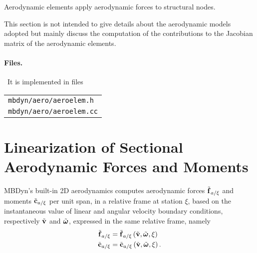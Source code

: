 %
%
%
%
%
% 
%
%
%

Aerodynamic elements apply aerodynamic forces to structural nodes.

This section is not intended 
to give details about the aerodynamic models adopted but mainly 
discuss the computation of the contributions to the Jacobian 
matrix of the aerodynamic elements.

\paragraph{Files.} \
It is implemented in files\\
\begin{tabular}{l}
\texttt{mbdyn/aero/aeroelem.h} \\
\texttt{mbdyn/aero/aeroelem.cc} 
\end{tabular}

\section{Linearization of Sectional Aerodynamic Forces and Moments}
MBDyn's built-in 2D aerodynamics computes
aerodynamic forces $\tilde{\bm{\mathbf{f}}}_{a/\xi}$
and moments $\tilde{\bm{\mathbf{c}}}_{a/\xi}$ per unit span,
in a relative frame at station $\xi$,
based on the instantaneous value of linear and angular velocity
boundary conditions, respectively $\tilde{\bm{\mathbf{v}}}$ and $\tilde{\bm{\mathbf{\omega}}}$,
expressed in the same relative frame, namely
\begin{subequations}
\begin{align}
	\tilde{\bm{\mathbf{f}}}_{a/\xi}
	&=
	\tilde{\bm{\mathbf{f}}}_{a/\xi}\left( \tilde{\bm{\mathbf{v}}}, \tilde{\bm{\mathbf{\omega}}}, \xi \right)
	\\
	\tilde{\bm{\mathbf{c}}}_{a/\xi}
	&=
	\tilde{\bm{\mathbf{c}}}_{a/\xi}\left( \tilde{\bm{\mathbf{v}}}, \tilde{\bm{\mathbf{\omega}}}, \xi \right)
	.
\end{align}
\end{subequations}

